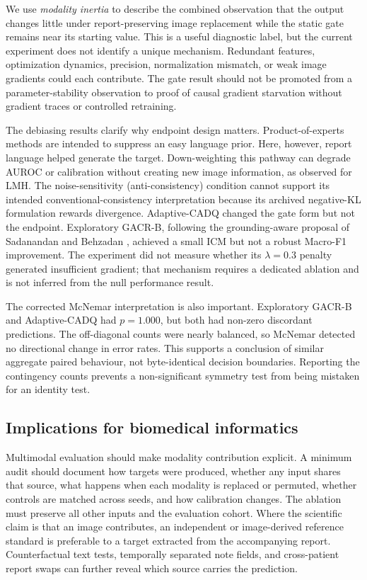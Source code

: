\documentclass[a4paper,fleqn]{cas-sc}
\begin{document}
We use \emph{modality inertia} to describe the combined observation that the
output changes little under report-preserving image replacement while the
static gate remains near its starting value. This is a useful diagnostic label,
but the current experiment does not identify a unique mechanism. Redundant
features, optimization dynamics, precision, normalization mismatch, or weak
image gradients could each contribute. The gate result should not be promoted
from a parameter-stability observation to proof of causal gradient starvation
without gradient traces or controlled retraining.

The debiasing results clarify why endpoint design matters. Product-of-experts
methods are intended to suppress an easy language prior. Here, however, report
language helped generate the target. Down-weighting this pathway can degrade
AUROC or calibration without creating new image information, as observed for
LMH. The noise-sensitivity (anti-consistency) condition cannot support its
intended conventional-consistency interpretation because its archived
negative-KL formulation rewards divergence. Adaptive-CADQ changed the gate form
but not the endpoint. Exploratory GACR-B, following the grounding-aware
proposal of Sadanandan and Behzadan
\cite{sadanandan2026consistentdangerous}, achieved a small ICM but not a robust
Macro-F1 improvement. The experiment did not measure whether its $\lambda=0.3$
penalty generated insufficient gradient; that mechanism requires a dedicated
ablation and is not inferred from the null performance result.

The corrected McNemar interpretation is also important. Exploratory GACR-B and
Adaptive-CADQ had $p=1.000$, but both had non-zero discordant predictions. The
off-diagonal counts were nearly balanced, so McNemar detected no directional
change in error rates. This supports a conclusion of similar aggregate paired
behaviour, not byte-identical decision boundaries. Reporting the contingency
counts prevents a non-significant symmetry test from being mistaken for an
identity test.

\subsection{Implications for biomedical informatics}\label{sec:implications}

Multimodal evaluation should make modality contribution explicit. A minimum
audit should document how targets were produced, whether any input shares that
source, what happens when each modality is replaced or permuted, whether
controls are matched across seeds, and how calibration changes. The ablation
must preserve all other inputs and the evaluation cohort. Where the scientific
claim is that an image contributes, an independent or image-derived reference
standard is preferable to a target extracted from the accompanying report.
Counterfactual text tests, temporally separated note fields, and cross-patient
report swaps can further reveal which source carries the prediction.
\end{document}

